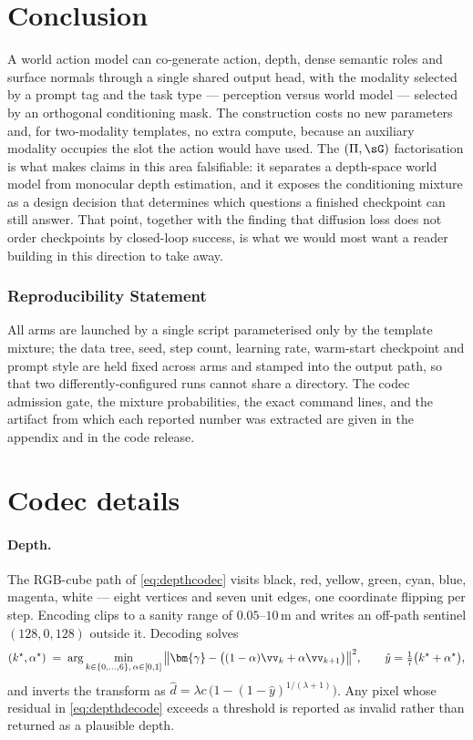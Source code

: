 \documentclass{article} %
\newcommand{\vgamma}{{\bm{\gamma}}}   %
\begin{document}
\section{Conclusion}

A world action model can co-generate action, depth, dense semantic roles and surface normals
through a single shared output head, with the modality selected by a prompt tag and the task type
--- perception versus world model --- selected by an orthogonal conditioning mask. The construction
costs no new parameters and, for two-modality templates, no extra compute, because an auxiliary
modality occupies the slot the action would have used. The $(\Pi,\sG)$ factorisation is what makes
claims in this area falsifiable: it separates a depth-space world model from monocular depth
estimation, and it exposes the conditioning mixture as a design decision that determines which
questions a finished checkpoint can still answer. That point, together with the finding that
diffusion loss does not order checkpoints by closed-loop success, is what we would most want a
reader building in this direction to take away.

\subsubsection*{Reproducibility Statement}
All arms are launched by a single script parameterised only by the template mixture; the data tree,
seed, step count, learning rate, warm-start checkpoint and prompt style are held fixed across arms
and stamped into the output path, so that two differently-configured runs cannot share a directory.
The codec admission gate, the mixture probabilities, the exact command lines, and the artifact from
which each reported number was extracted are given in the appendix and in the code release.




\appendix

\section{Codec details}
\label{app:codecs}

\paragraph{Depth.}
The RGB-cube path of \eqref{eq:depthcodec} visits black, red, yellow, green, cyan, blue, magenta,
white --- eight vertices and seven unit edges, one coordinate flipping per step. Encoding clips to
a sanity range of $0.05$--$10$\,m and writes an off-path sentinel $(128,0,128)$ outside it.
Decoding solves
\begin{equation}
(k^\star,\alpha^\star) \;=\; \arg\min_{k\in\{0,\dots,6\},\,\alpha\in[0,1]}
\big\|\vgamma - \big((1-\alpha)\vv_k+\alpha\vv_{k+1}\big)\big\|^2 ,
\qquad \hat y = \tfrac17\big(k^\star+\alpha^\star\big),
\label{eq:depthdecode}
\end{equation}
and inverts the transform as $\hat d = \lambda c\,\big(1-(1-\hat y)^{1/(\lambda+1)}\big)$. Any pixel whose
residual in \eqref{eq:depthdecode} exceeds a threshold is reported as invalid rather than returned
as a plausible depth.
\end{document}
